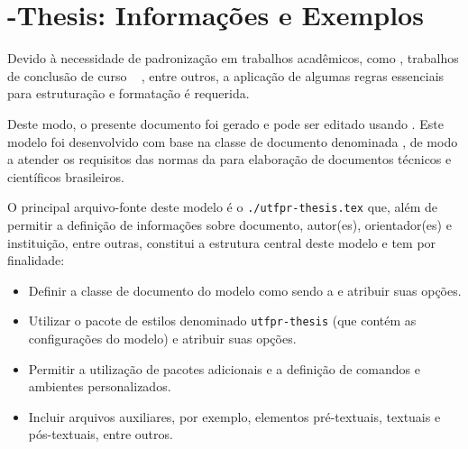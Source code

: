
\graphicspath{%
  {./Chapter-Example/}%
  {./Chapter-Example/Illustrations/}%
}

\chapter{\UTFPR-Thesis: Informações e Exemplos}%
\label{chpt:ex}

Devido à necessidade de padronização em trabalhos acadêmicos, como , trabalhos de conclusão de curso \textemdash\  \textemdash, entre outros, a aplicação de algumas regras essenciais para estruturação e formatação é requerida.

Deste modo, o presente documento foi gerado e pode ser editado usando .
Este modelo foi desenvolvido com base na classe de documento  denominada \texttt{}, de modo a atender os requisitos das normas da  para elaboração de documentos técnicos e científicos brasileiros.

O principal arquivo-fonte deste modelo é o \texttt{./utfpr-thesis.tex} que, além de permitir a definição de informações sobre documento, autor{(es)}, orientador{(es)} e instituição, entre outras, constitui a estrutura central deste modelo e tem por finalidade:

\begin{itemize}
\item Definir a classe de documento do modelo  como sendo a \texttt{} e atribuir suas opções.
\item Utilizar o pacote de estilos denominado \texttt{utfpr-thesis} (que contém as configurações do modelo) e atribuir suas opções.
\item Permitir a utilização de pacotes adicionais e a definição de comandos e ambientes personalizados.
\item Incluir arquivos auxiliares, por exemplo, elementos pré-textuais, textuais e pós-textuais, entre outros.
\end{itemize}

